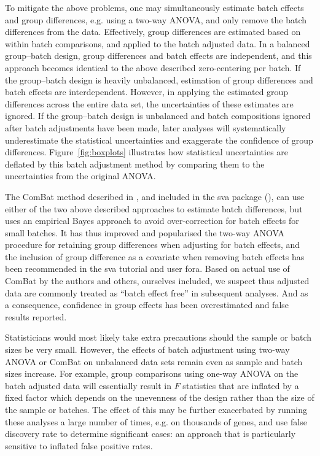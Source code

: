 \documentclass{bio}
\begin{document}
To mitigate the above problems, one may simultaneously estimate batch effects and group differences, e.g. using a two-way ANOVA, and only remove the batch differences from the data. Effectively, group differences are estimated based on within batch comparisons, and applied to the batch adjusted data. In a balanced group--batch design, group differences and batch effects are independent, and this approach becomes identical to the above described zero-centering per batch. If the group--batch design is heavily unbalanced, estimation of group differences and batch effects are interdependent. However, in applying the estimated group differences across the entire data set, the uncertainties of these estimates are ignored. If the group--batch design is unbalanced and batch compositions ignored after batch adjustments have been made, later analyses will systematically underestimate the statistical uncertainties and exaggerate the confidence of group differences. Figure~\ref{fig:boxplots} illustrates how statistical uncertainties are deflated by this batch adjustment method by comparing them to the uncertainties from the original ANOVA.

The ComBat method described in \citet{Johnson2007}, and included in the sva package (\citealp{Leek2012}), can use either of the two above described approaches to estimate batch differences, but uses an empirical Bayes approach to avoid over-correction for batch effects for small batches. It has thus improved and popularised the two-way ANOVA procedure for retaining group differences when adjusting for batch effects, and the inclusion of group difference as a covariate when removing batch effects has been recommended  in the sva tutorial and user fora. Based on actual use of ComBat by the authors and others, ourselves included, we suspect thus adjusted data are commonly treated as ``batch effect free'' in subsequent analyses. And as a consequence, confidence in group effects has been overestimated and false results reported.

Statisticians would most likely take extra precautions should the sample or batch sizes be very small. However, the effects of batch adjustment using two-way ANOVA or ComBat on unbalanced data sets remain even as sample and batch sizes increase. For example, group comparisons using one-way ANOVA on the batch adjusted data will essentially result in $F$ statistics that are inflated by a fixed factor which depends on the unevenness of the design rather than the size of the sample or batches. The effect of this may be further exacerbated by running these analyses a large number of times, e.g. on thousands of genes, and use false discovery rate to determine significant cases: an approach that is particularly sensitive to inflated false positive rates.
\end{document}

